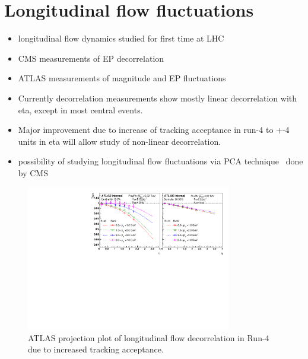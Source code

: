 \section{Longitudinal flow fluctuations}

\begin{itemize}
	\item longitudinal flow dynamics studied for first time at LHC
	\item CMS measurements of EP decorrelation~\cite{CMS-HIN-15-008}
	\item ATLAS measurements of magnitude and EP fluctuations~\cite{HION-2016-04}
	\item Currently decorrelation measurements show mostly linear decorrelation with eta, 
		    except in most central events.
	\item Major improvement due to increase of tracking acceptance in run-4 to +-4 units 
		    in eta will allow study of non-linear decorrelation.
	\item possibility of studying longitudinal flow fluctuations via PCA technique~\cite{Bhalerao:2014mua} done by CMS
\end{itemize}


\begin{figure}[!htb]
\begin{center}
\includegraphics[width=0.8\textwidth]{figs/atlas_projection_r221}
\caption{
ATLAS projection plot of longitudinal flow decorrelation in Run-4 
	due to increased tracking acceptance.
}
\label{fig:atlas_r221}
\end{center}
\end{figure}

